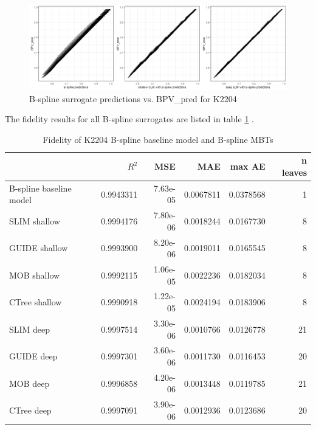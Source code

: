 \begin{figure}[!htb]
    \centering    
    \includegraphics[width = 14cm]{Figures/insurance_use_case/k2204_BPV/fit.png}
    \caption{B-spline surrogate predictions vs. BPV\_pred for K2204}
    \label{fig:ins_k2204_fit}
\end{figure}

The fidelity results for all B-spline surrogates are listed in table \ref{tab:ins_k2204_bsplines_surrogates_perf} .

\begin{table}

\caption{Fidelity of K2204 B-spline baseline model and  B-spline MBTs}
\centering \scriptsize
\begin{tabular}[t]{l|r|r|r|r|r}
\hline
  & $R^2$ & MSE & MAE & max AE & n leaves\\
\hline
B-spline baseline model & 0.9943311 & 7.63e-05 & 0.0067811 & 0.0378568 & 1\\
\hline
SLIM shallow & 0.9994176 & 7.80e-06 & 0.0018244 & 0.0167730 & 8\\
GUIDE shallow & 0.9993900 & 8.20e-06 & 0.0019011 & 0.0165545 & 8\\
MOB shallow & 0.9992115 & 1.06e-05 & 0.0022236 & 0.0182034 & 8\\
CTree shallow & 0.9990918 & 1.22e-05 & 0.0024194 & 0.0183906 & 8\\
\hline
SLIM deep & 0.9997514 & 3.30e-06 & 0.0010766 & 0.0126778 & 21\\
GUIDE deep & 0.9997301 & 3.60e-06 & 0.0011730 & 0.0116453 & 20\\
MOB deep & 0.9996858 & 4.20e-06 & 0.0013448 & 0.0119785 & 21\\
CTree deep & 0.9997091 & 3.90e-06 & 0.0012936 & 0.0123686 & 20\\
\hline
\end{tabular}
\label{tab:ins_k2204_bsplines_surrogates_perf}
\end{table}


